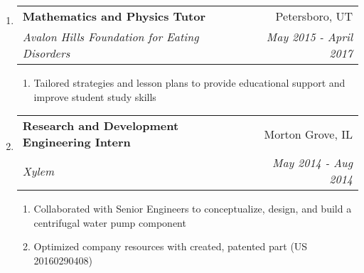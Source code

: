 \documentclass[letterpaper,10pt]{extarticle}
\makeatletter
\newcommand\tab[1][.25cm]{\hspace*{#1}} %
\newcommand{\ressubheading}[4]{
\begin{tabular*}{7.5in}{l@{\extracolsep{\fill}}r}
		\tab\textbf{#1} & #2 \\
		\tab\textit{#3} & \textit{#4} \\
\end{tabular*}\vspace{-6pt}}
\newcommand{\resitem}[1]{\item #1 \vspace{-2pt}}
\makeatother
\begin{document}
\begin{enumerate}
\item[]
	\ressubheading{Mathematics and Physics Tutor}{Petersboro, UT}{Avalon Hills Foundation for Eating Disorders}{May 2015 - April 2017}
	\begin{enumerate}
		\resitem[--]{Tailored strategies and lesson plans to provide educational support and improve student study skills}
	\end{enumerate}
\begin{comment}
\item[]
	\ressubheading{Summer Camp Counselor}{Logan, UT}{Stokes Nature Center}{May 2016 - Aug 2016}
	\begin{enumerate}
	\setlength\itemsep{-.25em}
		\resitem[--]{Planned and executed eight 1-wk long nature camps}
		\resitem[--]{Led groups of children safely through the wilderness for adventure and backpacking camps}
	\end{enumerate}	
\item[]
	\ressubheading{Utah State University}{Logan, UT}{Intensive English Language Institute (IELI) Teacher's Assistant}{Aug 2014 - May 2015}
	\begin{enumerate}
	\setlength\itemsep{-.25em}
		\resitem[--]{Instructed a classroom of international students in the English Language}
		\resitem[--]{Worked in tandem with supervising instructor to lead diverse, conversational groups to improve language skills}
	\end{enumerate}
\end{comment}		
	
	
\item[]
	\ressubheading{Research and Development Engineering Intern}{Morton Grove, IL}{Xylem}{May 2014 - Aug 2014}
	\begin{enumerate}
		\setlength\itemsep{-.25em}
		\resitem[--]{Collaborated with Senior Engineers to conceptualize, design, and build a centrifugal water pump component}
		\resitem[--]{Optimized company resources with created, patented part (US 20160290408)}
		
		
	\end{enumerate}


	
\begin{comment}
\item[]
	\ressubheading{General Electric Healthcare Life Sciences}{Logan, UT}{Media Biomanufacturing Production Technician}{Jun 2015 - Jan 2016}
	\begin{enumerate}
		\resitem[--]{Maintained cleanroom procedures to produce media for cell growth while maintaining hydraulic pressure, conductivity, pH, osmolarity, etc.}
	\end{enumerate}


\end{comment}
\end{enumerate}
\end{document}
